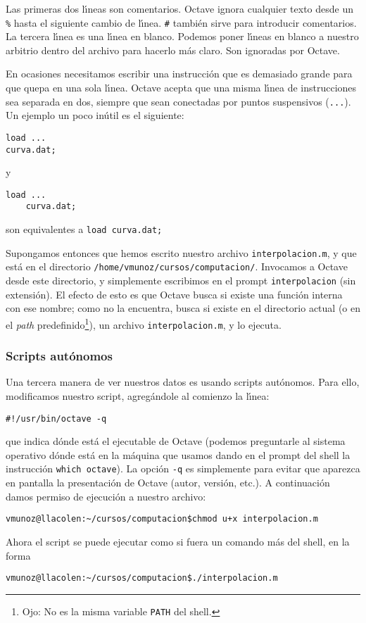 \documentclass[12pt]{article}
\begin{document}
Las primeras dos l\'{\i}neas son comentarios. Octave ignora cualquier
texto desde un \verb+%+ hasta el siguiente cambio de
l\'{\i}nea. \verb+#+ tambi\'en sirve para introducir comentarios.
La tercera l\'{\i}nea es una l\'{\i}nea en blanco. Podemos poner
l\'{\i}neas en blanco a nuestro arbitrio dentro del archivo para 
hacerlo m\'as claro. Son ignoradas por Octave. 

En ocasiones necesitamos escribir una instrucci\'on que es demasiado 
grande para que quepa en una sola l\'{\i}nea. Octave acepta que una
misma l\'{\i}nea de instrucciones sea separada en dos, siempre que
sean conectadas por puntos suspensivos (\verb+...+). Un ejemplo un
poco in\'util es el siguiente:
\begin{verbatim}
load ...
curva.dat;
\end{verbatim}
y
\begin{verbatim}
load ...
    curva.dat;
\end{verbatim}
son equivalentes a \verb+load curva.dat;+

Supongamos entonces que  hemos escrito nuestro archivo
\verb+interpolacion.m+,
y que est\'a en el directorio
\verb+/home/vmunoz/cursos/computacion/+.
Invocamos a Octave desde este directorio, y simplemente escribimos en
el prompt \verb+interpolacion+ (sin extensi\'on). El efecto de esto es
que Octave busca si existe una funci\'on interna con ese nombre; como
no la encuentra, busca si existe en el directorio actual (o en el {\it
  path\/} predefinido\footnote{Ojo: No es la misma variable
  {\tt PATH} del shell.}), un archivo \verb+interpolacion.m+, y lo
ejecuta. 

\subsubsection{Scripts aut\'onomos}

Una tercera manera de ver nuestros datos es usando scripts
aut\'onomos. Para ello, modificamos nuestro script, agreg\'andole al
comienzo la l\'{\i}nea:
\begin{verbatim}
#!/usr/bin/octave -q
\end{verbatim}
que indica d\'onde est\'a el ejecutable de Octave (podemos preguntarle
al sistema operativo d\'onde est\'a en la m\'aquina que usamos dando
en el prompt del shell la instrucci\'on \verb+which octave+). La
opci\'on \verb+-q+ es simplemente para evitar que aparezca en pantalla
la presentaci\'on de Octave (autor, versi\'on, etc.). A continuaci\'on
damos permiso de ejecuci\'on a nuestro archivo:
\begin{verbatim}
vmunoz@llacolen:~/cursos/computacion$chmod u+x interpolacion.m 
\end{verbatim}
Ahora el script se puede ejecutar como si fuera un comando m\'as del
shell, en la forma
\begin{verbatim}
vmunoz@llacolen:~/cursos/computacion$./interpolacion.m
\end{verbatim}
\end{document}
